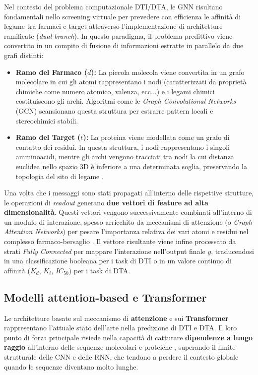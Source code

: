 Nel contesto del problema computazionale DTI/DTA, le GNN risultano fondamentali nello screening virtuale per prevedere con efficienza le affinità di legame tra farmaci e target attraverso l'implementazione di architetture ramificate (\textit{dual-branch}). In questo paradigma, il problema predittivo viene convertito in un compito di fusione di informazioni estratte in parallelo da due grafi distinti:
\begin{itemize}
    \item \textbf{Ramo del Farmaco ($d$):} La piccola molecola viene convertita in un grafo molecolare in cui gli atomi rappresentano i nodi (caratterizzati da proprietà chimiche come numero atomico, valenza, ecc...) e i legami chimici costituiscono gli archi. Algoritmi come le \textit{Graph Convolutional Networks} (GCN) scansionano questa struttura per estrarre pattern locali e stereochimici stabili.
    \item \textbf{Ramo del Target ($t$):} La proteina viene modellata come un grafo di contatto dei residui. In questa struttura, i nodi rappresentano i singoli amminoacidi, mentre gli archi vengono tracciati tra nodi la cui distanza euclidea nello spazio 3D è inferiore a una determinata soglia, preservando la topologia del sito di legame \cite{ahmadMachineLearningDrugtarget2026}.
\end{itemize}
Una volta che i messaggi sono stati propagati all'interno delle rispettive strutture, le operazioni di \textit{readout} generano \textbf{due vettori di feature ad alta dimensionalità}. Questi vettori vengono successivamente combinati all'interno di un modulo di interazione, spesso arricchito da meccanismi di attenzione (o \textit{Graph Attention Networks}) per pesare l'importanza relativa dei vari atomi e residui nel complesso farmaco-bersaglio \cite{ozsariDTAGNNToolkitConstructing2026}. Il vettore risultante viene infine processato da strati \textit{Fully Connected} per mappare l'interazione nell'output finale $y$, traducendosi in una classificazione booleana per i task di DTI o in un valore continuo di affinità ($K_d$, $K_i$, $IC_{50}$) per i task di DTA.
\subsection{Modelli attention-based e Transformer}
\label{subsubsection:modelli_transformer}
Le architetture basate sul meccanismo di \textbf{attenzione} e sui
\textbf{Transformer} rappresentano l'attuale stato dell'arte nella
predizione di DTI e DTA. Il loro punto di forza principale risiede nella
capacità di catturare \textbf{dipendenze a lungo raggio} all'interno delle
sequenze molecolari e proteiche \cite{ahmadMachineLearningDrugtarget2026, mondalAIdrivenDrugTarget2026a}, superando il limite strutturale delle CNN
e delle RNN, che tendono a perdere il contesto globale quando le sequenze
diventano molto lunghe.
